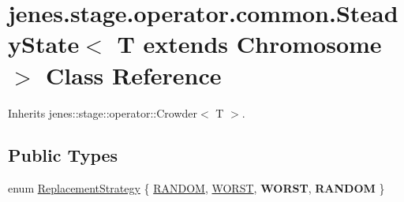 \hypertarget{classjenes_1_1stage_1_1operator_1_1common_1_1_steady_state_3_01_t_01extends_01_chromosome_01_4}{
\section{jenes.stage.operator.common.SteadyState$<$ T extends Chromosome $>$ Class Reference}
\label{classjenes_1_1stage_1_1operator_1_1common_1_1_steady_state_3_01_t_01extends_01_chromosome_01_4}
}
Inherits jenes::stage::operator::Crowder$<$ T $>$.

\subsection*{Public Types}
\begin{CompactItemize}
\item 
enum \hyperlink{classjenes_1_1stage_1_1operator_1_1common_1_1_steady_state_3_01_t_01extends_01_chromosome_01_4_da95b83b7d620e80c70fbed3b8159de1}{ReplacementStrategy} \{ \hyperlink{_island_g_a_8java_da95b83b7d620e80c70fbed3b8159de1a2b65445a3a16f164c5e811064d75726}{RANDOM}, 
\hyperlink{_island_g_a_8java_da95b83b7d620e80c70fbed3b8159de1ed58eb79392224559f176f4794c570e1}{WORST}, 
\textbf{WORST}, 
\textbf{RANDOM}
 \}
\end{CompactItemize}
